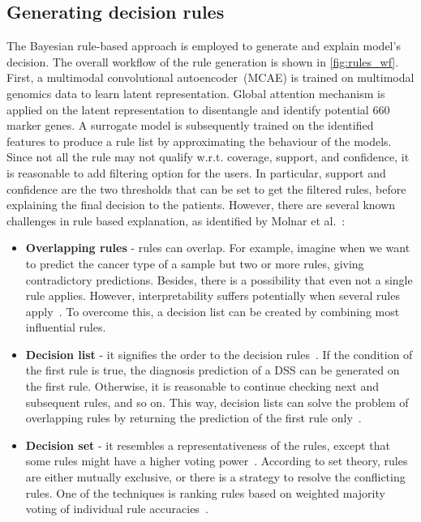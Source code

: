 \subsection{Generating decision rules}
The Bayesian rule-based approach is employed to generate and explain model's decision. The overall workflow of the rule generation is shown in \cref{fig:rules_wf}. First, a multimodal convolutional autoencoder~(MCAE) is trained on multimodal genomics data to learn latent representation. Global attention mechanism is applied on the latent representation to disentangle and identify potential 660 marker genes. 
A surrogate model is subsequently trained on the identified features to produce a rule list by approximating the behaviour of the  models. Since not all the rule may not qualify w.r.t. coverage, support, and confidence, it is reasonable to add filtering option for the users. In particular, support and confidence are the two thresholds that can be set to get the filtered rules, before explaining the final decision to the patients. However, there are several known challenges in rule based explanation, as identified by Molnar et al.~\cite{molnar2019interpretable}:  

\begin{itemize}[noitemsep]
    \item \textbf{Overlapping rules} - rules can overlap. For example, imagine when we want to predict the cancer type of a sample but two or more rules, giving contradictory predictions. Besides, there is a possibility that even not a single rule applies. However, interpretability suffers potentially when several rules apply~\cite{molnar2019interpretable}. To overcome this, a decision list can be created by combining most influential rules. 
    \item \textbf{Decision list} - it signifies the order to the decision rules~\cite{molnar2019interpretable}. If the condition of the first rule is true, the diagnosis prediction of a DSS can be generated on the first rule. Otherwise, it is reasonable to continue checking next and subsequent rules, and so on. This way, decision lists can solve the problem of overlapping rules by returning the prediction of the first rule only~\cite{molnar2019interpretable}. 
    \item \textbf{Decision set} - it resembles a representativeness of the rules, except that some rules might have a higher voting power~\cite{molnar2019interpretable}. According to set theory, rules are either mutually exclusive, or there is a strategy to resolve the conflicting rules. One of the techniques is ranking rules based on weighted majority voting of individual rule accuracies~\cite{molnar2019interpretable}. 
\end{itemize}

